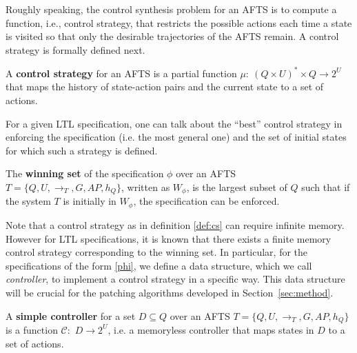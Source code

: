 

Roughly speaking, the control synthesis problem for an AFTS is to compute a function, i.e., control strategy, that restricts the possible actions each time a state is visited so that only the desirable trajectories of the AFTS remain. A control strategy is formally defined next.

\begin{definition}
	A \textbf{control strategy} for an AFTS is a partial function $ \mu:~(Q\times U)^*\times Q\rightarrow 2^U $ that maps the history of state-action pairs and the current state to a set of actions.\label{def:cs}
\end{definition}

For a given LTL specification, one can talk about the ``best'' control strategy in enforcing the specification
{\color{purple} (i.e. the most general one)}
and the set of initial states for which such a strategy is defined.

\begin{definition}
	The \textbf{winning set} of the specification $ \phi $ over an AFTS $T = \{Q,U,\rightarrow_T,G,AP,h_Q\}$, written as $ W_{\phi} $, is the largest subset of $ Q $ such that if the system $ T $ is initially in $ W_{\phi} $, the specification can be enforced.
\end{definition}

Note that a control strategy as in definition \ref{def:cs} can require infinite memory. However for LTL specifications, it is known that there exists a finite memory control strategy corresponding to the winning set. In particular, for the specifications of the form \eqref{phi}, we define a data structure, which we call \emph{controller}, to implement a control strategy in a specific way. This data structure will be crucial for the patching algorithms developed
{\color{purple} in Section~\ref{sec:method}}.

\begin{definition}
	A \textbf{simple controller} for a set $ D\subseteq Q $ over an AFTS $ T=\{Q,U,\rightarrow_T,G,AP,h_Q\} $ is a function $ \mathcal{C}: $ $ D\rightarrow 2^U $, i.e. a memoryless controller that maps states in $ D $ to a set of actions. %
	\label{def:simp}
\end{definition}

